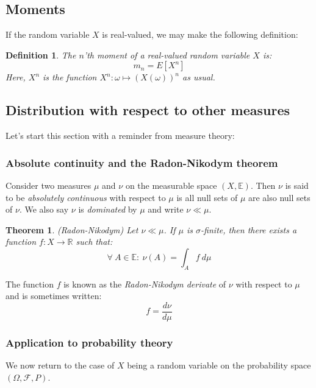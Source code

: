 \documentclass[12pt, a4paper]{article}
\newtheorem{theorem}{Theorem}[section]
\newtheorem{definition}{Definition}[section]
\begin{document}
\subsection{Moments}
If the random variable $X$ is real-valued, we may make the following definition:
\begin{definition}
The $n$'th moment of a real-valued random variable $X$ is:
\begin{equation}
m_n=E[X^n]
\end{equation}
Here, $X^n$ is the function $X^n:\omega\mapsto \left(X(\omega)\right)^n$ as usual.
\end{definition}

\subsection{Distribution with respect to other measures}
Let's start this section with a reminder from measure theory:

\subsubsection{Absolute continuity and the Radon-Nikodym theorem}
Consider two measures $\mu$ and $\nu$ on the measurable space $(X,\mathbb{E})$. Then $\nu$ is said to be \textit{absolutely continuous} with respect to $\mu$ is all null sets of $\mu$ are also null sets of $\nu$. We also say $\nu$ is \textit{dominated} by $\mu$ and write $\nu\ll\mu$.

\begin{theorem}
\label{radon_nikodym}
(Radon-Nikodym) Let $\nu\ll\mu$. If $\mu$ is $\sigma$-finite, then there exists a function $f: X\rightarrow\mathbb{R}$ such that:
\begin{equation}
\forall\ A\in\mathbb{E}:\ \nu(A)=\int_A f\ d\mu
\end{equation}
\end{theorem}

The function $f$ is known as the \textit{Radon-Nikodym derivate} of $\nu$ with respect to $\mu$ and is sometimes written:
\begin{equation}
f=\frac{d\nu}{d\mu}
\end{equation}

\subsubsection{Application to probability theory}
We now return to the case of $X$ being a random variable on the probability space $(\Omega, \mathcal{F}, P)$.
\end{document}
